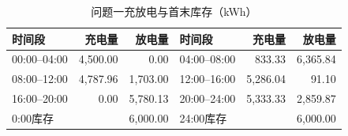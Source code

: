 \begin{table}[H]\centering\small\setlength{\tabcolsep}{4pt}\caption{问题一充放电与首末库存（kWh）}
\begin{tabular}{lrr lrr}\toprule
时间段 & 充电量 & 放电量 & 时间段 & 充电量 & 放电量\\\midrule
00:00--04:00 & 4,500.00 & 0.00 & 04:00--08:00 & 833.33 & 6,365.84\\
08:00--12:00 & 4,787.96 & 1,703.00 & 12:00--16:00 & 5,286.04 & 91.10\\
16:00--20:00 & 0.00 & 5,780.13 & 20:00--24:00 & 5,333.33 & 2,859.87\\
\midrule
0:00库存 & \multicolumn{2}{r}{6,000.00} & 24:00库存 & \multicolumn{2}{r}{6,000.00}\\
\bottomrule\end{tabular}\end{table}
